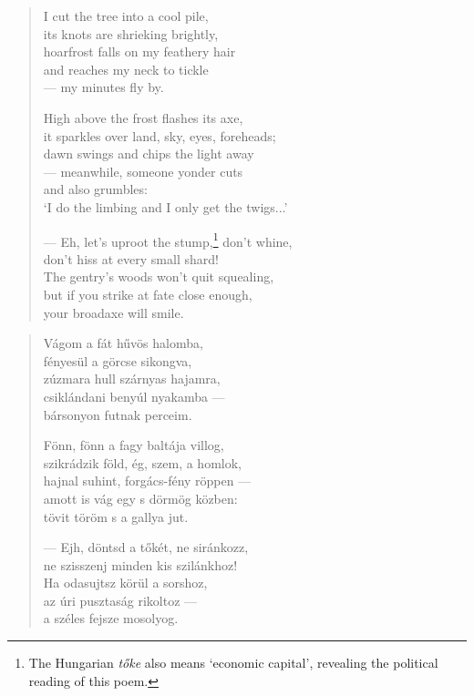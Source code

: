 \documentclass[11pt]{book}
\newcommand*{\centeredornament}{\centerline{\pgfornament[width=6cm]{88}}}
\begin{document}
\newpage

\vspace*{-15mm}
\centeredornament



\begin{verse}
  I cut the tree into a cool pile, \\
  its knots are shrieking brightly, \\
  hoarfrost falls on my feathery hair \\
  and reaches my neck to tickle \\
  --- my minutes fly by.

  High above the frost flashes its axe, \\
  it sparkles over land, sky, eyes, foreheads; \\
  dawn swings and chips the light away \\
  --- meanwhile, someone yonder cuts \\
  and also grumbles: \\
  `I do the limbing and I only get the twigs...'

  --- Eh, let's uproot the stump,\footnote{The Hungarian \emph{tőke}
  also means `economic capital', revealing the political reading of
  this poem.} don't whine, \\
  don't hiss at every small shard! \\
  The gentry's woods won't quit squealing, \\
  but if you strike at fate close enough, \\
  your broadaxe will smile.
\end{verse}

\newpage

\vspace*{-15mm}
\centeredornament



\begin{verse}
  Vágom a fát hűvös halomba, \\
  fényesül a görcse sikongva, \\
  zúzmara hull szárnyas hajamra, \\
  csiklándani benyúl nyakamba --- \\
  bársonyon futnak perceim.

  Fönn, fönn a fagy baltája villog, \\
  szikrádzik föld, ég, szem, a homlok, \\
  hajnal suhint, forgács-fény röppen --- \\
  amott is vág egy s dörmög közben: \\
  tövit töröm s a gallya jut.

  --- Ejh, döntsd a tőkét, ne siránkozz, \\
  ne szisszenj minden kis szilánkhoz! \\
  Ha odasujtsz körül a sorshoz, \\
  az úri pusztaság rikoltoz --- \\
  a széles fejsze mosolyog.
\end{verse}
\end{document}
